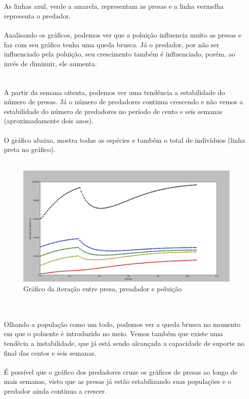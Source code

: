 \documentclass[a4paper]{article}
\begin{document}
\\
\\
As linhas azul, verde a amarela, representam as presas e a linha vermelha representa o predador.
\\
\\
Analisando os gr\'aficos, podemos ver que a polui\c{c}\~ao influencia muito as presas e faz com seu gr\'afico tenha uma queda brusca. J\'a o predador, por n\~ao ser influenciado pela polui\c{c}\~ao, seu crescimento tamb\'em \'e influenciado, por\'em, ao inv\'es de diminuir, ele aumenta.\\
\\
\\
A partir da semana oitenta, podemos ver uma tend\^encia a estabilidade do n\'umero de presas. J\'a o n\'umero de predadores continua crescendo e n\~ao vemos a estabilidade do n\'umero de predadores no per\'iodo de cento e seis semanas (aproximadamente dois anos).
\\
\\
O gr\'afico abaixo, mostra todas as esp\'ecies e tamb\'em o total de indiv\'iduos (linha preta no gr\'afico).
\\
\\
\begin{figure}[!htb]
\centering
\caption{Gr\'afico da itera\c{c}\~ao entre presa, preadador e polui\c{c}\~ao}
\includegraphics[scale=0.25]{graf_total_ind.png}
\end{figure}
\\
\\
Olhando a popula\c{c}\~ao como um todo, podemos ver a queda brusca no momento em que o poluente \'e introduzido no meio. Vemos tamb\'em que existe uma tend\^ecia a instabilidade, que j\'a est\'a sendo alcan\c{c}ada a capacidade de suporte no final das centos e seis semanas.
\\
\\
\'E poss\'ivel que o gr\'afico dos predadores cruze os gr\'aficos de presas ao longo de mais semanas, visto que as presas j\'a est\~ao estabilizando suas popula\c{c}\~oes e o predador ainda continua a crescer.
\\
\\
\end{document}
